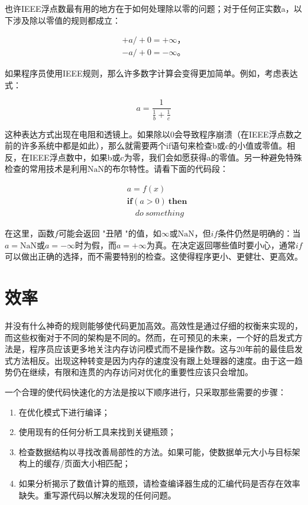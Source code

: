 \documentclass[lang=cn,10pt]{elegantbook}
\begin{document}
也许IEEE浮点数最有用的地方在于如何处理除以零的问题；对于任何正实数a，以下涉及除以零值的规则都成立：

\[
  \begin{aligned}
  +a /+0=+\infty， \\
  -a /+0=-\infty。 
  \end{aligned}
\]


如果程序员使用IEEE规则，那么许多数字计算会变得更加简单。例如，考虑表达式：

\[a=\frac{1}{\frac{1}{b}+\frac{1}{c}}\]

这种表达方式出现在电阻和透镜上。如果除以0会导致程序崩溃（在IEEE浮点数之前的许多系统中都是如此），那么就需要两个if语句来检查b或c的小值或零值。相反，在IEEE浮点数中，如果b或c为零，我们会如愿获得a的零值。另一种避免特殊检查的常用技术是利用$\mathrm{NaN}$的布尔特性。请看下面的代码段：

\[
  \begin{aligned}
  &a=f(x) \\
  &\textbf{if}(a>0) \  \textbf{then} \\ 
  &\quad do \  something
  \end{aligned}
\]

在这里，函数$f$可能会返回 "丑陋 "的值，如$\infty$或$\mathrm{NaN}$，但$if$条件仍然是明确的：当$a=\mathrm{NaN}$或$a=-\infty$时为假，而$a=+\infty$为真。在决定返回哪些值时要小心，通常$if$可以做出正确的选择，而不需要特别的检查。这使得程序更小、更健壮、更高效。

\section{效率}

并没有什么神奇的规则能够使代码更加高效。高效性是通过仔细的权衡来实现的，而这些权衡对于不同的架构是不同的。然而，在可预见的未来，一个好的启发式方法是，程序员应该更多地关注内存访问模式而不是操作数。这与20年前的最佳启发式方法相反。出现这种转变是因为内存的速度没有跟上处理器的速度。由于这一趋势仍在继续，有限和连贯的内存访问对优化的重要性应该只会增加。

一个合理的使代码快速化的方法是按以下顺序进行，只采取那些需要的步骤：

\begin{enumerate}
  \item 在优化模式下进行编译；
  \item 使用现有的任何分析工具来找到关键瓶颈；
  \item 检查数据结构以寻找改善局部性的方法。如果可能，使数据单元大小与目标架构上的缓存/页面大小相匹配；
  \item 如果分析揭示了数值计算的瓶颈，请检查编译器生成的汇编代码是否存在效率缺失。重写源代码以解决发现的任何问题。
\end{enumerate}
\end{document}
